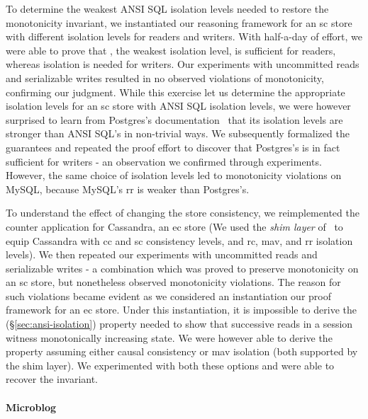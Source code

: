 To determine the weakest ANSI SQL isolation levels needed to restore
the monotonicity invariant, we instantiated our reasoning framework
for an {\sc sc} store with different isolation levels for readers and
writers.  With half-a-day of effort, we were able to prove that
, the weakest isolation level, is sufficient
for readers, whereas  isolation is needed for
writers. Our experiments with uncommitted reads and serializable
writes resulted in no observed violations of monotonicity, confirming
our judgment. While this exercise let us determine the appropriate
isolation levels for an {\sc sc} store with ANSI SQL isolation levels,
we were however surprised to learn from Postgres's
documentation~\cite{postgres} that its isolation levels are stronger
than ANSI SQL's in non-trivial ways. We subsequently formalized the
guarantees and repeated the proof effort to discover that Postgres's
 is in fact sufficient for writers - an
observation we confirmed through experiments. However, the same choice
of isolation levels led to monotonicity violations on MySQL, because
MySQL's {\sc rr} is weaker than Postgres's.

To understand the effect of changing the store consistency, we
reimplemented the counter application for Cassandra, an {\sc ec} store
(We used the \emph{shim layer} of~\cite{pldi15} to equip Cassandra
with {\sc cc} and {\sc sc} consistency levels, and {\sc rc}, {\sc
mav}, and {\sc rr} isolation levels). We then repeated our experiments
with uncommitted reads and serializable writes - a combination which
was proved to preserve monotonicity on an {\sc sc} store, but
nonetheless observed monotonicity violations. The reason for such
violations became evident as we considered an instantiation our proof
framework for an {\sc ec} store. Under this instantiation, it is
impossible to derive the  (\S\ref{sec:ansi-isolation})
property needed to show that successive reads in a session witness
monotonically increasing state. We were however able to derive the
property assuming either causal consistency or {\sc mav} isolation
(both supported by the shim layer). We experimented with both these
options and were able to recover the invariant.


\paragraph{Microblog}

